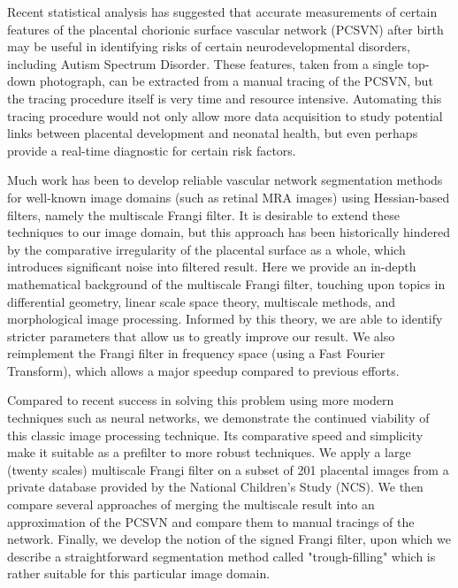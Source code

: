 

Recent statistical analysis has suggested that accurate measurements of certain features of the placental chorionic surface vascular network (PCSVN) after birth may be useful in identifying risks of certain neurodevelopmental disorders, including Autism Spectrum Disorder. These features, taken from a single top-down photograph, can be extracted from a manual tracing of the PCSVN, but the tracing procedure itself is very time and resource intensive. Automating this tracing procedure would not only allow more data acquisition to study potential links between placental development and neonatal health, but even perhaps provide a real-time diagnostic for certain risk factors.

Much work has been to develop reliable vascular network segmentation methods for well-known image domains (such as retinal MRA images) using Hessian-based filters, namely the multiscale Frangi filter. It is desirable to extend these techniques to our image domain, but this approach has been historically hindered by the comparative irregularity of the placental surface as a whole, which introduces significant noise into filtered result. Here we provide an in-depth mathematical background of the multiscale Frangi filter, touching upon topics in differential geometry, linear scale space theory, multiscale methods, and morphological image processing. Informed by this theory, we are able to identify stricter parameters that allow us to greatly improve our result. We also reimplement the Frangi filter in frequency space (using a Fast Fourier Transform), which allows a major speedup compared to previous efforts.

Compared to recent success in solving this problem using more modern techniques such as neural networks, we demonstrate the continued viability of this classic image processing technique. Its comparative speed and simplicity make it suitable as a prefilter to more robust techniques. We apply a large (twenty scales) multiscale Frangi filter on a subset of 201 placental images from a private database provided by the National Children's Study (NCS). We then compare several approaches of merging the multiscale result into an approximation of the PCSVN and compare them to manual tracings of the network. Finally, we develop the notion of the signed Frangi filter, upon which we describe a straightforward segmentation method called "trough-filling" which is rather suitable for this particular image domain.




